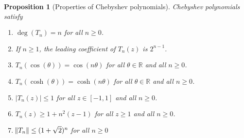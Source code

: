 \documentclass[12pt]{article}
\newtheorem{proposition}[definition]{Proposition}
\newcommand{\R}{\mathbb{R}}  %
\begin{document}
\begin{proposition}[Properties of Chebyshev polynomials]
\label{proposition:properties-of-chebyshev-polynomials}
Chebyshev polynomials satisfy
\begin{enumerate}
\item $\deg(T_n) = n$ for all $n \ge 0$.
\item If $n \ge 1$, the leading coefficient of $T_n(z)$ is $2^{n-1}$.
\item $T_n(\cos(\theta)) = \cos(n \theta)$ for all $\theta \in \R$ and all $n \ge 0$.
\item $T_n(\cosh(\theta)) = \cosh(n \theta)$ for all $\theta \in \R$ and all $n \ge 0$.
\item $|T_n(z)| \le 1$ for all $z \in [-1,1]$ and all $n \ge 0$.
\item $T_n(z) \ge 1 + n^2(z - 1)$ for all $z \ge 1$ and all $n \ge 0$.
\item $\norm{T_n} \le (1+\sqrt{2})^n$ for all $n \ge 0$
\end{enumerate}
\end{proposition}
\end{document}

